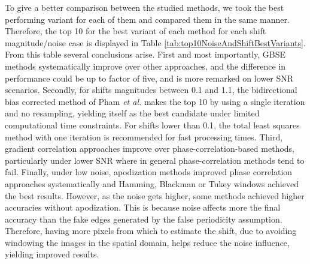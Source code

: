 
To give a better comparison between the studied methods, we took the best performing variant for each of them and compared them in the same manner. Therefore, the top 10 for the best variant of each method for each shift magnitude/noise case is displayed in Table \ref{tab:top10NoiseAndShiftBestVariants}. From this table several conclusions arise. First and most importantly, GBSE methods systematically improve over other approaches, and the difference in performance could be up to factor of five, and is more remarked on lower SNR scenarios. Secondly, for shifts magnitudes between 0.1 and 1.1, the bidirectional bias corrected method of Pham \emph{et al.} makes the top 10 by using a single iteration and no resampling, yielding itself as the best candidate under limited computational time constraints. For shifts lower than 0.1, the total least squares method with one iteration is recommended for fast processing times. Third, gradient correlation approaches improve over phase-correlation-based methods, particularly under lower SNR where in general phase-correlation methods tend to fail. Finally, under low noise, apodization methods improved phase correlation approaches systematically and Hamming, Blackman or Tukey windows achieved the best results. However, as the noise gets higher, some methods achieved higher accuracies without apodization. This is because noise affects more the final accuracy than the fake edges generated by the false periodicity assumption. Therefore, having more pixels from which to estimate the shift, due to avoiding windowing the images in the spatial domain, helps reduce the noise influence, yielding improved results.

